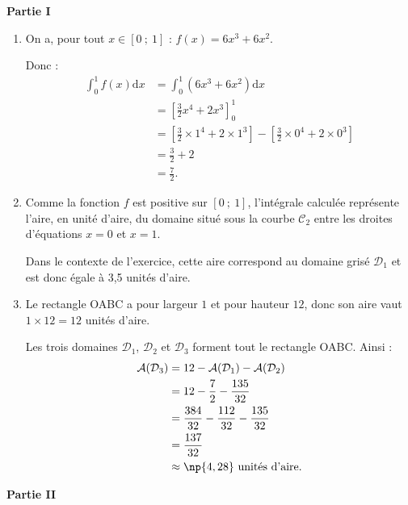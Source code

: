 \bigskip

\textbf{\large Partie I}

\medskip

\begin{enumerate}
\item  On a, pour tout $x\in[0~;~1]$ : $f(x)=6x^3+6x^2$.

Donc :
\begin{align*}
\int_0^1 f(x)\mathrm{d}x &= \int_0^1\left(6x^3+6x^2\right)\mathrm{d}x \\
&= \left[\frac32x^4+2x^3\right]_0^1 \\
&= \left[\frac32\times1^4+2\times1^3\right] - \left[\frac32\times0^4+2\times0^3\right] \\
&=\frac32+2 \\
&= \frac72.
\end{align*}

\item Comme la fonction $f$ est positive sur $[0~;~1]$, l'intégrale calculée représente l'aire, en unité d'aire, du domaine situé sous la courbe $\mathcal{C}_2$ entre les droites d'équations $x=0$ et $x=1$.

Dans le contexte de l'exercice, cette aire correspond au domaine grisé $\mathcal{D}_1$ et est donc égale à 3,5 unités d'aire.

\item  Le rectangle OABC a pour largeur $1$ et pour hauteur $12$, donc son aire vaut $1\times 12=12$ unités d'aire.

Les trois domaines $\mathcal{D}_1$, $\mathcal{D}_2$ et $\mathcal{D}_3$ forment tout le rectangle OABC. Ainsi :
\begin{align*}
\mathcal{A}(\mathcal{D}_3) &= 12-\mathcal{A}(\mathcal{D}_1)-\mathcal{A}(\mathcal{D}_2) \\
&= 12-\dfrac72-\dfrac{135}{32} \\
&= \dfrac{384}{32}-\dfrac{112}{32}-\dfrac{135}{32} \\
&= \dfrac{137}{32} \\
&\approx \np{4,28} \text{ unités d'aire.}
\end{align*}
\end{enumerate}

\bigskip

\textbf{\large Partie II}

\medskip


